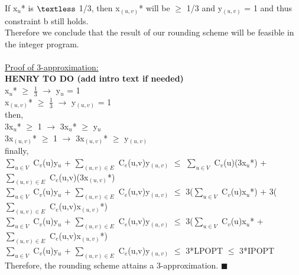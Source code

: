 \documentclass[10pt]{csc_assignment}
\begin{document}
\begin{description}
\begin{flushleft}
If x$_{u}$* is $\textless$ 1/3, then x$_{(u, v)}$* will be  $\geqslant$ 1/3 and y$_{(u,v)}$ = 1 and thus constraint b still holds. \\
Therefore we conclude that the result of our rounding scheme will be feasible in the integer program.\\
~\\
\underline{Proof of 3-approximation:}\\
\textbf{HENRY TO DO (add intro text if needed)}\\
x$_{u}$* $\geqslant$ $\frac{1}{3}$ $\rightarrow$ y$_{u}$ = 1\\
x$_{(u, v)}$* $\geqslant$ $\frac{1}{3}$ $\rightarrow$ y$_{(u, v)}$ = 1\\
then,\\
3x$_{u}$* $\geqslant$ 1 $\rightarrow$ 3x$_{u}$* $\geqslant$ y$_{u}$\\
3x$_{(u, v)}$* $\geqslant$ 1 $\rightarrow$ 3x$_{(u, v)}$* $\geqslant$ y$_{(u, v)}$\\
finally,\\
$\sum_{u \in V}$ C$_{v}$(u)y$_{u}$ + $\sum_{(u, v) \in E}$ C$_{e}$(u,v)y$_{(u, v)}$ $\leqslant$
$\sum_{u \in V}$ C$_{v}$(u)(3x$_{u}$*) + $\sum_{(u, v) \in E}$ C$_{e}$(u,v)(3x$_{(u, v)}$*)\\
$\sum_{u \in V}$ C$_{v}$(u)y$_{u}$ + $\sum_{(u, v) \in E}$ C$_{e}$(u,v)y$_{(u, v)}$ $\leqslant$
3($\sum_{u \in V}$ C$_{v}$(u)x$_{u}$*) + 3($\sum_{(u, v) \in E}$ C$_{e}$(u,v)x$_{(u, v)}$*)\\
$\sum_{u \in V}$ C$_{v}$(u)y$_{u}$ + $\sum_{(u, v) \in E}$ C$_{e}$(u,v)y$_{(u, v)}$ $\leqslant$
3($\sum_{u \in V}$ C$_{v}$(u)x$_{u}$* + $\sum_{(u, v) \in E}$ C$_{e}$(u,v)x$_{(u, v)}$*)\\
$\sum_{u \in V}$ C$_{v}$(u)y$_{u}$ + $\sum_{(u, v) \in E}$ C$_{e}$(u,v)y$_{(u, v)}$ $\leqslant$ 3*LPOPT $\leqslant$ 3*IPOPT\\
Therefore, the rounding scheme attains a 3-approximation. $\blacksquare$\\
\end{flushleft}
\end{description}
\end{document}
